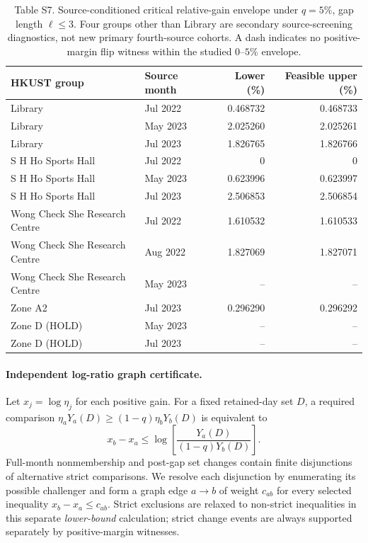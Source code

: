 \documentclass[11pt]{article}
\begin{document}
\begin{table}[htbp]
\centering
\caption*{Table S7. Source-conditioned critical relative-gain envelope under $q=5\%$, gap length $\ell\leq3$. Four groups other than Library are secondary source-screening diagnostics, not new primary fourth-source cohorts. A dash indicates no positive-margin flip witness within the studied $0$--$5\%$ envelope.}
\small
\begin{tabular}{p{4.4cm}lrr}
\toprule
HKUST group & Source month & Lower (\%) & Feasible upper (\%) \\
\midrule
Library & Jul 2022 & 0.468732 & 0.468733\\
Library & May 2023 & 2.025260 & 2.025261\\
Library & Jul 2023 & 1.826765 & 1.826766\\
S H Ho Sports Hall & Jul 2022 & 0 & 0\\
S H Ho Sports Hall & May 2023 & 0.623996 & 0.623997\\
S H Ho Sports Hall & Jul 2023 & 2.506853 & 2.506854\\
Wong Check She Research Centre & Jul 2022 & 1.610532 & 1.610533\\
Wong Check She Research Centre & Aug 2022 & 1.827069 & 1.827071\\
Wong Check She Research Centre & May 2023 & -- & --\\
Zone A2 & Jul 2023 & 0.296290 & 0.296292\\
Zone D (HOLD) & May 2023 & -- & --\\
Zone D (HOLD) & Jul 2023 & -- & --\\
\bottomrule
\end{tabular}
\end{table}

\paragraph{Independent log-ratio graph certificate.}
Let $x_j=\log\eta_j$ for each positive gain. For a fixed retained-day set $D$, a required comparison
$\eta_aY_a(D)\ge(1-q)\eta_bY_b(D)$ is equivalent to
\[
  x_b-x_a\le
  \log\left[\frac{Y_a(D)}{(1-q)Y_b(D)}\right].
\]
Full-month nonmembership and post-gap set changes contain finite disjunctions of alternative strict comparisons. We resolve each disjunction by enumerating its possible challenger and form a graph edge $a\to b$ of weight $c_{ab}$ for every selected inequality $x_b-x_a\le c_{ab}$. Strict exclusions are relaxed to non-strict inequalities in this separate \emph{lower-bound} calculation; strict change events are always supported separately by positive-margin witnesses.
\end{document}

